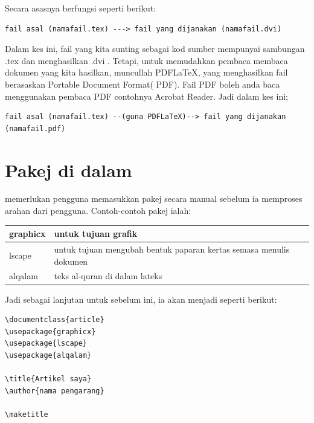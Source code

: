 Secara asasnya \latex{} berfungsi seperti berikut:\\

\begin{Verbatim}[frame=single]
 fail asal (namafail.tex) ---> fail yang dijanakan (namafail.dvi)
\end{Verbatim}

Dalam kes ini, fail yang kita sunting sebagai kod sumber mempunyai sambungan .tex dan menghasilkan .dvi . 
Tetapi, untuk memudahkan pembaca membaca dokumen yang kita hasilkan, muncullah PDFLaTeX, yang menghasilkan fail berasaskan Portable Document Format( PDF).
Fail PDF boleh anda baca menggunakan pembaca PDF contohnya Acrobat Reader. Jadi dalam kes ini;\\

\begin{Verbatim}[frame=single]
 fail asal (namafail.tex) --(guna PDFLaTeX)--> fail yang dijanakan (namafail.pdf)
\end{Verbatim}

\section{Pakej di dalam \latex{}}
\latex{} memerlukan pengguna memasukkan pakej secara manual sebelum ia memproses arahan dari pengguna. Contoh-contoh pakej ialah:\\

\begin{minipage}{\textwidth}

\begin{center}
\begin{tabular}{|l|l|}
\hline
 graphicx&  untuk tujuan grafik \\ \hline
 lscape& untuk tujuan mengubah bentuk paparan kertas semasa menulis dokumen\\ \hline
 alqalam&  teks al-quran di dalam lateks\\\hline
\end{tabular}
\end{center}   
\end{minipage}
\bigskip

Jadi sebagai lanjutan untuk sebelum ini, ia akan menjadi seperti berikut:\\

\begin{lstlisting}[frame=shadowbox]
\documentclass{article}
\usepackage{graphicx}
\usepackage{lscape}
\usepackage{alqalam}

\title{Artikel saya}
\author{nama pengarang}

\maketitle

\end{lstlisting}
